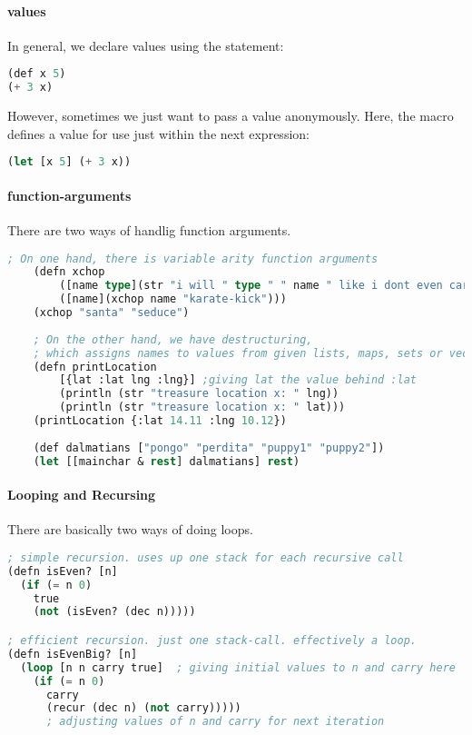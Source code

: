 \paragraph{values} In general, we declare values using the  statement:
\begin{lstlisting}[language=lisp]
(def x 5)
(+ 3 x)
\end{lstlisting}
However, sometimes we just want to pass a value anonymously. Here, the  macro defines a value for use just within the next expression:
\begin{lstlisting}[language=lisp]
(let [x 5] (+ 3 x))
\end{lstlisting}

\paragraph{function-arguments} There are two ways of handlig function arguments.

\begin{lstlisting}[language=lisp]
    ; On one hand, there is variable arity function arguments
    (defn xchop
        ([name type](str "i will " type " " name " like i dont even care"))
        ([name](xchop name "karate-kick")))
    (xchop "santa" "seduce")
    
    ; On the other hand, we have destructuring, 
    ; which assigns names to values from given lists, maps, sets or vectors
    (defn printLocation 
        [{lat :lat lng :lng}] ;giving lat the value behind :lat
        (println (str "treasure location x: " lng))
        (println (str "treasure location x: " lat)))
    (printLocation {:lat 14.11 :lng 10.12})
    
    (def dalmatians ["pongo" "perdita" "puppy1" "puppy2"])
    (let [[mainchar & rest] dalmatians] rest)
\end{lstlisting}

\paragraph{Looping and Recursing} There are basically two ways of doing loops.

\begin{lstlisting}[language=lisp]
; simple recursion. uses up one stack for each recursive call
(defn isEven? [n]
  (if (= n 0)
    true
    (not (isEven? (dec n)))))

; efficient recursion. just one stack-call. effectively a loop.
(defn isEvenBig? [n]
  (loop [n n carry true]  ; giving initial values to n and carry here 
    (if (= n 0)
      carry
      (recur (dec n) (not carry)))))
      ; adjusting values of n and carry for next iteration
\end{lstlisting}


